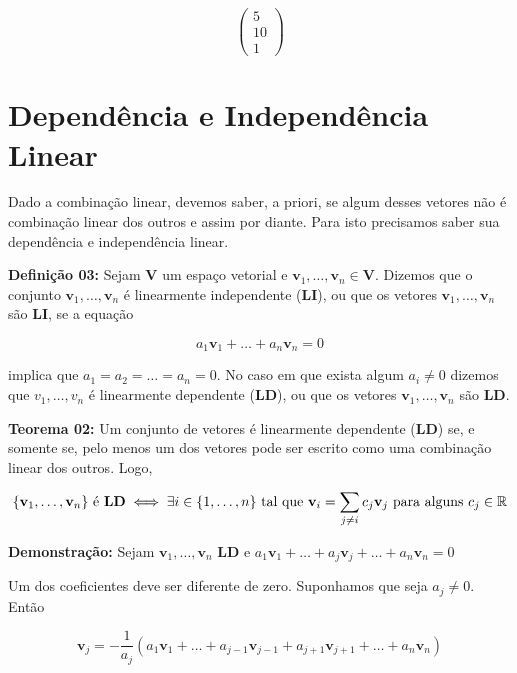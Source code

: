 \[
\begin{pmatrix} 5 \\ 10 \\ 1 \end{pmatrix}
\]


\section{Dependência e Independência Linear}
Dado a combinação linear, devemos saber, a priori, se algum desses vetores não é combinação linear dos outros e assim por diante. Para isto precisamos saber sua dependência e independência linear.\nocite{camargo2005}

\noindent\textbf{Definição 03:} Sejam $\mathbf{V}$ um espaço vetorial e $\mathbf{v}_1, \ldots, \mathbf{v}_n \in \mathbf{V}$. Dizemos que o conjunto ${\mathbf{v}_1, \ldots, \mathbf{v}_n}$ é linearmente independente (\textbf{LI}), ou que os vetores $\mathbf{v}_1, \ldots, \mathbf{v}_n$ são \textbf{LI}, se a equação

\begin{equation}
	a_1\mathbf{v}_1 + \ldots + a_n\mathbf{v}_n = 0
\end{equation}

\noindent implica que $a_1 = a_2 = \ldots = a_n = 0$. No caso em que exista algum $a_i \neq 0$ dizemos que ${v_1, \ldots, v_n}$ é linearmente dependente (\textbf{LD}), ou que os vetores $\mathbf{v}_1, \ldots, \mathbf{v}_n$ são \textbf{LD}.

\noindent\textbf{Teorema 02:} Um conjunto de vetores é linearmente dependente (\textbf{LD}) se, e somente se, pelo menos um dos vetores pode ser escrito como uma combinação linear dos outros. Logo,

\begin{equation}
\{\mathbf{v}_1, \ldots, \mathbf{v}_n \} \text{ é \textbf{LD}} \iff \exists i \in \{1, \ldots, n\} \text{ tal que } \mathbf{v}_i = \sum_{j \neq i} c_j \mathbf{v}_j \text{ para alguns } c_j \in \mathbb{R}
\end{equation}

\noindent\textbf{Demonstração:} Sejam $\mathbf{v}_1, \ldots, \mathbf{v}_n$ \textbf{LD} e $a_1\mathbf{v}_1 + \ldots + a_j\mathbf{v}_j + \ldots + a_n\mathbf{v}_n = 0$

\noindent Um dos coeficientes deve ser diferente de zero. Suponhamos que seja $a_j \neq 0$. Então 

\begin{equation}
	\mathbf{v}_j = -\frac{1}{a_j}(a_1\mathbf{v}_1 + \ldots + a_{j - 1}\mathbf{v}_{j - 1} + a_{j + 1}\mathbf{v}_{j + 1} + \ldots + a_n\mathbf{v}_n)
\end{equation}


